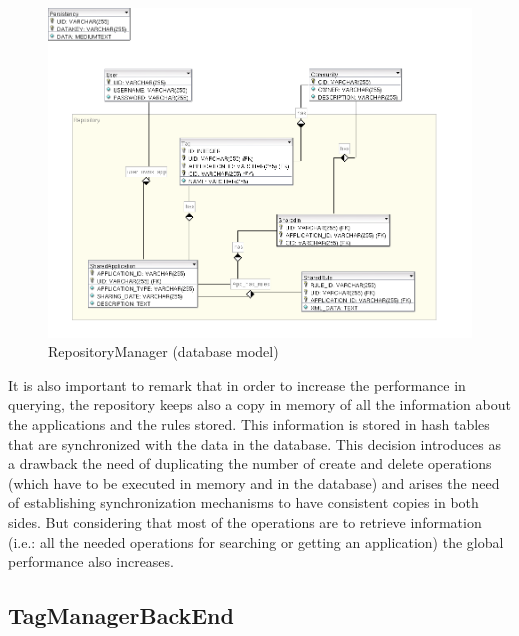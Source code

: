 \begin{figure}[h!]
 \begin{center}
 \includegraphics[scale=0.4]{diagrams/RepositoryManagerDBModel.png}
  \caption{\label{img:rm-db-model}RepositoryManager (database model)}
 \end{center}
\end{figure}

It is also important to remark that in order to increase the performance in
querying, the repository keeps also a copy in memory of all the
information about the applications and the rules stored. This
information is stored in hash tables that are synchronized with the data in the
database.
\newline
This decision introduces as a drawback the need of duplicating the number of
create and delete operations (which have to be executed in memory and in the
database) and arises the need of establishing synchronization mechanisms to have
consistent copies in both sides. But considering that most of the operations are
to retrieve information (i.e.: all the needed operations for searching or
getting an application) the global performance also increases.



\subsection{TagManagerBackEnd}
\label{subsec:tmbe-design}

